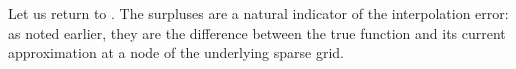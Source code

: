 Let us return to . The surpluses are a natural indicator
of the interpolation error: as noted earlier, they are the difference between
the true function and its current approximation at a node of the underlying
sparse grid.
